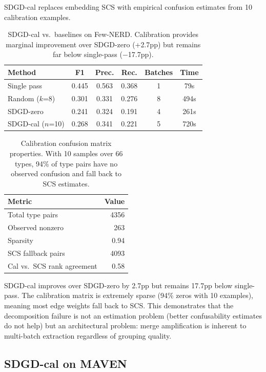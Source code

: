 \documentclass[11pt,a4paper]{article}
\begin{document}
SDGD-cal replaces embedding SCS with empirical confusion estimates from 10 calibration examples.

\begin{table}[h]
\centering
\small
\begin{tabular}{@{}lccccc@{}}
\toprule
\textbf{Method} & \textbf{F1} & \textbf{Prec.} & \textbf{Rec.} & \textbf{Batches} & \textbf{Time} \\
\midrule
Single pass & 0.445 & 0.563 & 0.368 & 1 & 79s \\
Random ($k$=8) & 0.301 & 0.331 & 0.276 & 8 & 494s \\
SDGD-zero & 0.241 & 0.324 & 0.191 & 4 & 261s \\
SDGD-cal ($n$=10) & 0.268 & 0.341 & 0.221 & 5 & 720s \\
\bottomrule
\end{tabular}
\caption{SDGD-cal vs.\ baselines on Few-NERD. Calibration provides marginal improvement over SDGD-zero (+2.7pp) but remains far below single-pass ($-$17.7pp).}
\label{tab:sdgd_cal_fewnerd}
\end{table}

\begin{table}[h]
\centering
\small
\begin{tabular}{@{}lr@{}}
\toprule
\textbf{Metric} & \textbf{Value} \\
\midrule
Total type pairs & 4356 \\
Observed nonzero & 263 \\
Sparsity & 0.94 \\
SCS fallback pairs & 4093 \\
Cal vs.\ SCS rank agreement & 0.58 \\
\bottomrule
\end{tabular}
\caption{Calibration confusion matrix properties. With 10 samples over 66 types, 94\% of type pairs have no observed confusion and fall back to SCS estimates.}
\label{tab:cal_matrix}
\end{table}

SDGD-cal improves over SDGD-zero by 2.7pp but remains 17.7pp below single-pass. The calibration matrix is extremely sparse (94\% zeros with 10 examples), meaning most edge weights fall back to SCS. This demonstrates that the decomposition failure is not an estimation problem (better confusability estimates do not help) but an architectural problem: merge amplification is inherent to multi-batch extraction regardless of grouping quality.

\subsection{SDGD-cal on MAVEN}
\label{sec:sdgd_cal_maven}
\end{document}
